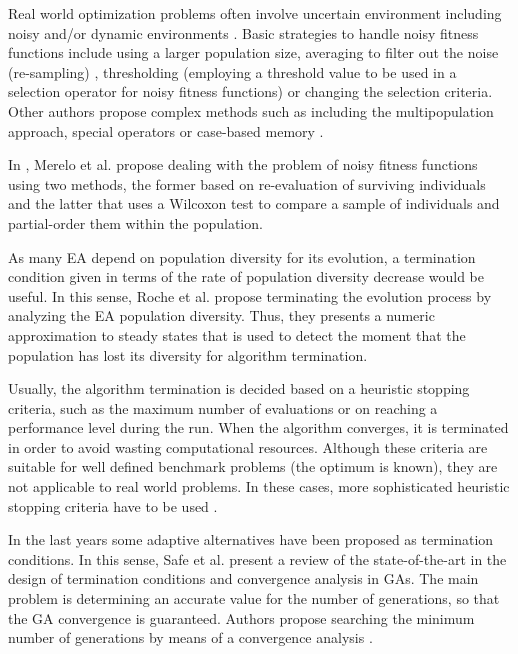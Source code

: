 \documentclass[runningheads,a4paper]{llncs}
\begin{document}
Real world optimization problems often involve uncertain environment including noisy and/or dynamic environments \cite{Jin2005303,QianYZ13}.
Basic strategies to handle noisy fitness functions include using a larger population size, averaging to filter out the noise (re-sampling) \cite{Branke98,Branke2001}, thresholding (employing a threshold value to be used in a selection operator for noisy fitness functions) \cite{Markon2001} or changing the selection criteria.
Other authors propose complex methods such as including the multipopulation approach, special operators or case-based memory \cite{BhattacharyaIM14}. 



In \cite{merelo14:noisy}, Merelo et al. propose dealing with the problem of noisy fitness functions using two methods, the former based on re-evaluation of surviving individuals and the latter that uses a Wilcoxon test to compare a sample of individuals and partial-order them within the population.


As many EA depend on population diversity for its evolution, a termination condition given in terms of the rate of population diversity decrease would be useful. 
In this sense, Roche et al. \cite{RocheTermination13} propose terminating the evolution process by analyzing the EA population diversity. Thus, they presents a numeric approximation to steady states that is used to detect the moment that the population has lost its diversity for algorithm termination.


Usually, the algorithm termination is decided based on a heuristic stopping criteria, such as the maximum number of evaluations or on reaching a performance level during the run. 
When the algorithm converges, it is terminated in order to avoid wasting computational resources.
Although these criteria are suitable for well defined benchmark problems (the optimum is known), they are not applicable to real world problems. 
In these cases, more sophisticated heuristic stopping criteria have to be used \cite{NME2909,Wagner2009,Wagner2010}.

In the last years some adaptive alternatives have been proposed  as termination conditions.
In this sense, Safe et al. \cite{Safe2004} present a review of the state-of-the-art in the design of termination conditions and convergence analysis in GAs.
The main problem is determining an accurate value for the number of generations, so that the GA convergence is guaranteed.
Authors propose searching the minimum number of generations by means of a convergence analysis \cite{Rudolph1994}.
\end{document}
